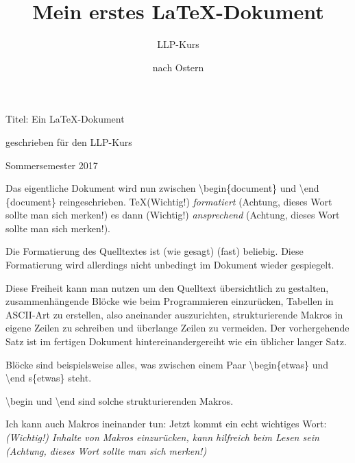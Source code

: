 \documentclass{scrartcl}
\title{Mein erstes \LaTeX-Dokument}
\author{LLP-Kurs}
\date{nach Ostern}
\newcommand{\wichtig}[1]{(Wichtig!) \emph{#1} (Achtung, dieses Wort sollte man sich merken!)}
\newcommand{\tb}{\textbackslash}
\renewcommand{\maketitle}{
  Titel: Ein \LaTeX-Dokument

  geschrieben für den LLP-Kurs

  Sommersemester 2017

}
\begin{document}
\maketitle
  Das eigentliche Dokument         wird      nun
  zwischen
  \tb begin\{document\} und
  \tb end  \{document\}
  reingeschrieben.
  \TeX \wichtig {formatiert}        es dann \wichtig {ansprechend}.

  Die Formatierung des Quelltextes ist (wie gesagt) (fast) beliebig.  Diese
  Formatierung wird allerdings nicht unbedingt im Dokument wieder gespiegelt.

  Diese Freiheit kann man nutzen um
    den Quelltext übersichtlich zu gestalten,
    zusammenhängende Blöcke wie beim Programmieren           einzurücken,
    Tabellen in      ASCII-Art zu erstellen, also aneinander auszurichten,
    strukturierende Makros in eigene Zeilen zu schreiben
   und
    überlange Zeilen zu vermeiden.
  Der vorhergehende Satz ist im fertigen Dokument hintereinandergereiht wie ein üblicher langer Satz.

  Blöcke sind beispielsweise alles, was zwischen einem Paar
  \tb begin\{etwas\}
    und
  \tb end  s\{etwas\}
  steht.

  \tb begin und \tb end sind solche strukturierenden Makros.

  Ich kann auch Makros ineinander tun: Jetzt kommt ein echt
  wichtiges Wort:
  \emph{
    \wichtig {Inhalte von Makros einzurücken, kann hilfreich beim Lesen sein}
  }
\end{document}
